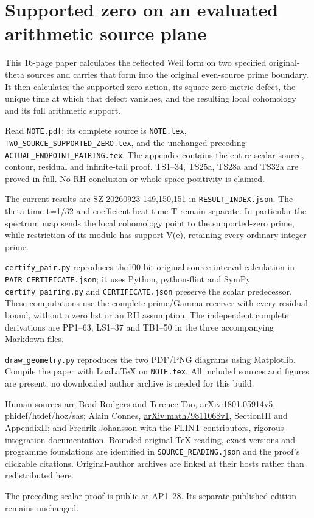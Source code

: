 \documentclass[
]{article}
\author{}
\date{}
\begin{document}
\section{Supported zero on an evaluated arithmetic source
plane}\label{supported-zero-on-an-evaluated-arithmetic-source-plane}

This 16-page paper calculates the reflected Weil form on two specified
original-theta sources and carries that form into the original
even-source prime boundary. It then calculates the supported-zero
action, its square-zero metric defect, the unique time at which that
defect vanishes, and the resulting local cohomology and its full
arithmetic support.

Read \texttt{NOTE.pdf}; its complete source is \texttt{NOTE.tex},
\texttt{TWO\_SOURCE\_SUPPORTED\_ZERO.tex}, and the unchanged preceding
\texttt{ACTUAL\_ENDPOINT\_PAIRING.tex}. The appendix contains the entire
scalar source, contour, residual and infinite-tail proof. TS1--34,
TS25a, TS28a and TS32a are proved in full. No RH conclusion or
whole-space positivity is claimed.

The current results are SZ-20260923-149,150,151 in
\texttt{RESULT\_INDEX.json}. The theta time t=1/32 and coefficient heat
time T remain separate. In particular the spectrum map sends the local
cohomology point to the supported-zero prime, while restriction of its
module has support V(e), retaining every ordinary integer prime.

\texttt{certify\_pair.py} reproduces the100-bit original-source interval
calculation in \texttt{PAIR\_CERTIFICATE.json}; it uses Python,
python-flint and SymPy. \texttt{certify\_pairing.py} and
\texttt{CERTIFICATE.json} preserve the scalar predecessor. These
computations use the complete prime/Gamma receiver with every residual
bound, without a zero list or an RH assumption. The independent complete
derivations are PP1--63, LS1--37 and TB1--50 in the three accompanying
Markdown files.

\texttt{draw\_geometry.py} reproduces the two PDF/PNG diagrams using
Matplotlib. Compile the paper with LuaLaTeX on \texttt{NOTE.tex}. All
included sources and figures are present; no downloaded author archive
is needed for this build.

Human sources are Brad Rodgers and Terence Tao,
\href{https://arxiv.org/abs/1801.05914v5}{arXiv:1801.05914v5},
phidef/htdef/hoz/sas; Alain Connes,
\href{https://arxiv.org/abs/math/9811068v1}{arXiv:math/9811068v1},
SectionIII and AppendixII; and Fredrik Johansson with the FLINT
contributors,
\href{https://raw.githubusercontent.com/flintlib/flint/master/doc/source/acb_calc.rst}{rigorous
integration documentation}. Bounded original-TeX reading, exact versions
and programme foundations are identified in
\texttt{SOURCE\_READING.json} and the proof's clickable citations.
Original-author archives are linked at their hosts rather than
redistributed here.

The preceding scalar proof is public at
\href{https://github.com/KokunoYumeto/zeta-function-research-reader/blob/acd7016b8232a56f31ae3e69fb800571e8789080/workbenches/splitzero-tandem/continuations/20260923-retained-source-readers/arithmetic-pairing/ACTUAL_ENDPOINT_PAIRING.tex}{AP1--28}.
Its separate published edition remains unchanged.
\end{document}
